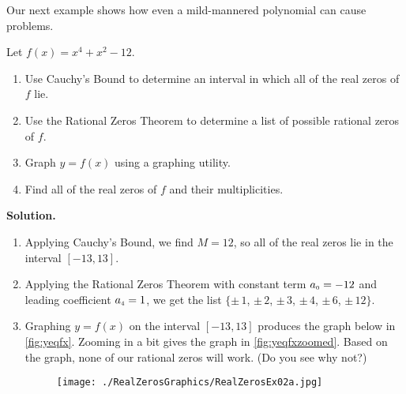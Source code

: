 Our next example shows how even a mild-mannered polynomial can cause problems.

\begin{ex}  \label{polyquadinform} Let $f(x) = x^4 + x^2 - 12$.

\begin{enumerate}

\item  Use Cauchy's Bound to determine an interval in which all of the real zeros of $f$ lie.

\item  Use the Rational Zeros Theorem to determine a list of possible rational zeros of $f$.

\item  Graph $y=f(x)$ using a graphing utility.

\item  Find all of the real zeros of $f$ and their multiplicities.


\end{enumerate}

{\bf Solution.}

\begin{enumerate}

\item  Applying Cauchy's Bound, we find $M = 12$, so all of the real zeros lie in the interval $[-13,13]$.

\item  Applying the Rational Zeros Theorem with constant term $a_{\mbox{\tiny$0$}} = -12$ and leading coefficient $a_{\mbox{\tiny$4$}} = 1$, we get the list $\{\pm \, 1$, $\pm \, 2$, $\pm \, 3$, $\pm \, 4$, $\pm \, 6$, $\pm \, 12\}$.

\item  Graphing $y=f(x)$ on the interval $[-13,13]$ produces the graph below in \autoref{fig:yeqfx}.  Zooming in a bit gives the graph in \autoref{fig:yeqfxzoomed}.  Based on the graph, none of our rational zeros will work. (Do you see why not?)

\begin{figure}
\begin{center}

\texttt{[image: ./RealZerosGraphics/RealZerosEx02a.jpg]}

\caption{}
\label{fig:yeqfx}
\end{center}
\end{figure}

\begin{figure}
\begin{center}
  

\end{center}
\end{figure}
\end{enumerate}
\end{ex}
